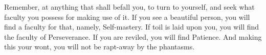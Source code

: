 Remember, at anything that shall befall you, to turn to yourself, and seek what
faculty you possess  for making use of  it. If you see a  beautiful person, you
will find a faculty  for that, namely, Self-mastery. If toil  is laid upon you,
you will find  the faculty of Perseverance.  If you are reviled,  you will find
Patience.  And  making  this your  wont,  you  will  not  be rapt-away  by  the
phantasms.
